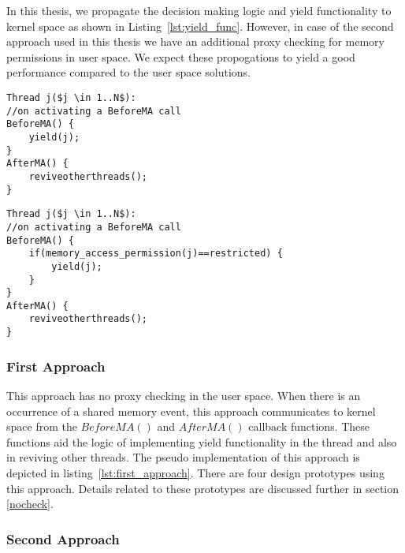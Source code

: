 In this thesis, we propagate the decision making logic and yield functionality to kernel space as shown in Listing~\ref{lst:yield_func}. 
However, in case of the second approach used in this thesis we have an additional proxy checking for memory permissions in user space. 
We expect these propogations to yield a good performance compared to the user space solutions. 

\noindent\begin{minipage}{.45\textwidth}
\begin{lstlisting}[mathescape=true,style=customc,caption={First Approach},frame=tlrb,label={lst:first_approach}]
Thread j($j \in 1..N$): 
//on activating a BeforeMA call
BeforeMA() {
	yield(j);
}
AfterMA() {
	reviveotherthreads();
}
\end{lstlisting}
\end{minipage}\hfill
\begin{minipage}{.45\textwidth}
\begin{lstlisting}[mathescape=true,style=customc,caption={Second Approach},frame=tlrb,label={lst:second_approach}]
Thread j($j \in 1..N$): 
//on activating a BeforeMA call
BeforeMA() {
	if(memory_access_permission(j)==restricted) {
		yield(j);
	}
}
AfterMA() {
	reviveotherthreads();
}
\end{lstlisting}
\end{minipage}


\subsubsection{First Approach}

This approach has no proxy checking in the user space. 
When there is an occurrence of a shared memory event, this approach communicates to kernel space from the $BeforeMA()$ and $AfterMA()$ callback functions. 
These functions aid the logic of implementing yield functionality in the thread and also in reviving other threads. 
The pseudo implementation of this approach is depicted in listing~\ref{lst:first_approach}.
There are four design prototypes using this approach. 
Details related to these prototypes are discussed further in section \ref{nocheck}.

\subsubsection{Second Approach}

